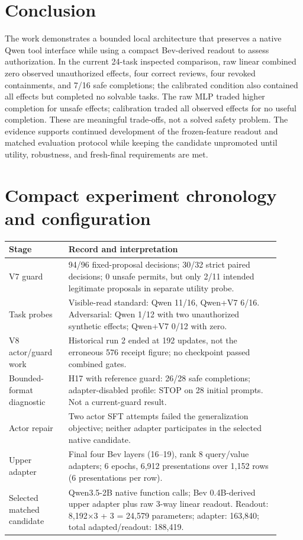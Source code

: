 \documentclass[11pt]{article}
\begin{document}
\section{Conclusion}
The work demonstrates a bounded local architecture that preserves a native Qwen tool interface while using a compact Bev-derived readout to assess authorization. In the current 24-task inspected comparison, raw linear combined zero observed unauthorized effects, four correct reviews, four revoked containments, and 7/16 safe completions; the calibrated condition also contained all effects but completed no solvable tasks. The raw MLP traded higher completion for unsafe effects; calibration traded all observed effects for no useful completion. These are meaningful trade-offs, not a solved safety problem. The evidence supports continued development of the frozen-feature readout and matched evaluation protocol while keeping the candidate unpromoted until utility, robustness, and fresh-final requirements are met.

\clearpage
\appendix
\section{Compact experiment chronology and configuration}
\begin{table}[ht]
\centering
\small
\begin{tabular}{p{0.20\linewidth}p{0.71\linewidth}}
\toprule
Stage & Record and interpretation\\
\midrule
V7 guard & 94/96 fixed-proposal decisions; 30/32 strict paired decisions; 0 unsafe permits, but only 2/11 intended legitimate proposals in separate utility probe.\\
Task probes & Visible-read standard: Qwen 11/16, Qwen+V7 6/16. Adversarial: Qwen 1/12 with two unauthorized synthetic effects; Qwen+V7 0/12 with zero.\\
V8 actor/guard work & Historical run 2 ended at 192 updates, not the erroneous 576 receipt figure; no checkpoint passed combined gates.\\
Bounded-format diagnostic & H17 with reference guard: 26/28 safe completions; adapter-disabled profile: STOP on 28 initial prompts. Not a current-guard result.\\
Actor repair & Two actor SFT attempts failed the generalization objective; neither adapter participates in the selected native candidate.\\
Upper adapter & Final four Bev layers (16--19), rank 8 query/value adapters; 6 epochs, 6,912 presentations over 1,152 rows (6 presentations per row).\\
Selected matched candidate & Qwen3.5-2B native function calls; Bev 0.4B-derived upper adapter plus raw 3-way linear readout. Readout: 8,192$\times$3 + 3 = 24,579 parameters; adapter: 163,840; total adapted/readout: 188,419.\\
\bottomrule
\end{tabular}
\end{table}
\end{document}
